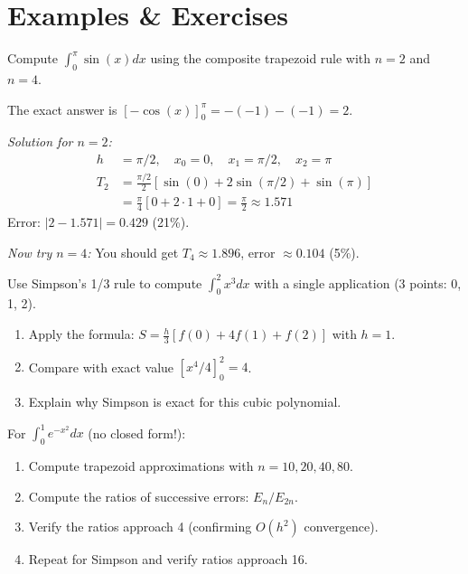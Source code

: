\newpage
\section{Examples \& Exercises}


 Compute $\int_0^\pi \sin(x) dx$ using the composite trapezoid rule with $n = 2$ and $n = 4$.

The exact answer is $[-\cos(x)]_0^\pi = -(-1) - (-1) = 2$.

\vspace{0.5em}
\textit{Solution for $n=2$:}
\begin{align*}
    h &= \pi/2, \quad x_0 = 0, \quad x_1 = \pi/2, \quad x_2 = \pi \\
    T_2 &= \frac{\pi/2}{2}[\sin(0) + 2\sin(\pi/2) + \sin(\pi)] \\
    &= \frac{\pi}{4}[0 + 2 \cdot 1 + 0] = \frac{\pi}{2} \approx 1.571
\end{align*}
Error: $|2 - 1.571| = 0.429$ (21\%).

\vspace{0.5em}
\textit{Now try $n=4$:} You should get $T_4 \approx 1.896$, error $\approx 0.104$ (5\%).


\vspace{2em}
 Use Simpson's 1/3 rule to compute $\int_0^2 x^3 dx$ with a single application (3 points: 0, 1, 2).

\begin{enumerate}[label=(\alph*)]
    \item Apply the formula: $S = \frac{h}{3}[f(0) + 4f(1) + f(2)]$ with $h = 1$.
    \item Compare with exact value $[x^4/4]_0^2 = 4$.
    \item Explain why Simpson is exact for this cubic polynomial.
\end{enumerate}


\vspace{2em}
 For $\int_0^1 e^{-x^2} dx$ (no closed form!):
\begin{enumerate}[label=(\alph*)]
    \item Compute trapezoid approximations with $n = 10, 20, 40, 80$.
    \item Compute the ratios of successive errors: $E_{n}/E_{2n}$.
    \item Verify the ratios approach 4 (confirming $O(h^2)$ convergence).
    \item Repeat for Simpson and verify ratios approach 16.
\end{enumerate}


